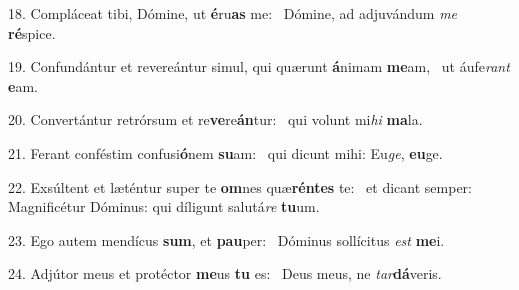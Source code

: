 18. Compláceat tibi, Dómine, ut \textbf{é}ru\textbf{as} me: \ast\  Dómine, ad adjuvándum \textit{me} \textbf{ré}spice.\

19. Confundántur et revereántur simul, qui quærunt \textbf{á}nimam \textbf{me}am, \ast\  ut áufe\textit{rant} \textbf{e}am.\

20. Convertántur retrórsum et re\textbf{ve}re\textbf{án}tur: \ast\  qui volunt mi\textit{hi} \textbf{ma}la.\

21. Ferant conféstim confusi\textbf{ó}nem \textbf{su}am: \ast\  qui dicunt mihi: Eu\textit{ge}, \textbf{eu}ge.\

22. Exsúltent et læténtur super te \textbf{om}nes quæ\textbf{rén}\textbf{tes} te: \ast\  et dicant semper: Magnificétur Dóminus: qui díligunt salutá\textit{re} \textbf{tu}um.\

23. Ego autem mendícus \textbf{sum}, et \textbf{pau}per: \ast\  Dóminus sollícitus \textit{est} \textbf{me}i.\

24. Adjútor meus et protéctor \textbf{me}us \textbf{tu} es: \ast\  Deus meus, ne \textit{tar}\textbf{dá}veris.\

